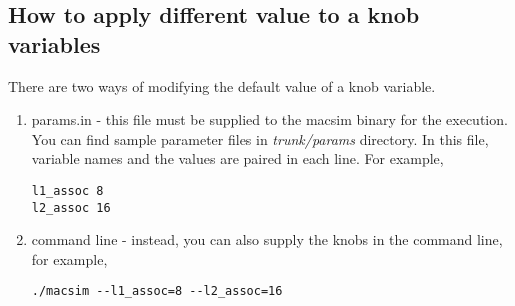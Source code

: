 \subsection{How to apply different value to a knob variables}

There are two ways of modifying the default value of a knob variable.

\begin{enumerate}
  \item params.in - this file must be supplied to the macsim binary
  for the execution. You can find sample parameter files
  in \textit{trunk/params} directory. In this file, variable names and
  the values are paired in each line. For example,

\smallskip
\begin{lstlisting}
l1_assoc 8
l2_assoc 16
\end{lstlisting}
\smallskip


  \item command line - instead, you can also supply the knobs in the command line, for example,

\smallskip
\begin{lstlisting}
./macsim --l1_assoc=8 --l2_assoc=16
\end{lstlisting}
\smallskip

\end{enumerate}


